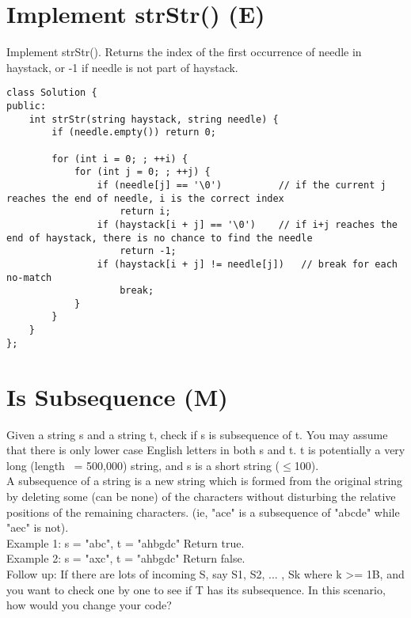 \section{Implement strStr() (E)}
Implement strStr(). Returns the index of the first occurrence of needle in haystack, or -1 if needle is not part of haystack. \\

\begin{lstlisting}
class Solution {
public:
    int strStr(string haystack, string needle) {
        if (needle.empty()) return 0;

        for (int i = 0; ; ++i) {
            for (int j = 0; ; ++j) {
                if (needle[j] == '\0')          // if the current j reaches the end of needle, i is the correct index
                    return i;
                if (haystack[i + j] == '\0')    // if i+j reaches the end of haystack, there is no chance to find the needle
                    return -1;
                if (haystack[i + j] != needle[j])   // break for each no-match
                    break;
            }
        }
    }
};
\end{lstlisting}


\section{Is Subsequence (M)}
Given a string s and a string t, check if s is subsequence of t. You may assume that there is only lower case English letters in both s and t. t is potentially a very long (length ~= 500,000) string, and s is a short string ($\leq$100).\\

A subsequence of a string is a new string which is formed from the original string by deleting some (can be none) of the characters without disturbing the relative positions of the remaining characters. (ie, "ace" is a subsequence of "abcde" while "aec" is not).\\

Example 1:
s = "abc", t = "ahbgdc"
Return true.\\

Example 2:
s = "axc", t = "ahbgdc"
Return false.\\

Follow up:
If there are lots of incoming S, say S1, S2, ... , Sk where k >= 1B, and you want to check one by one to see if T has its subsequence. In this scenario, how would you change your code?\\

